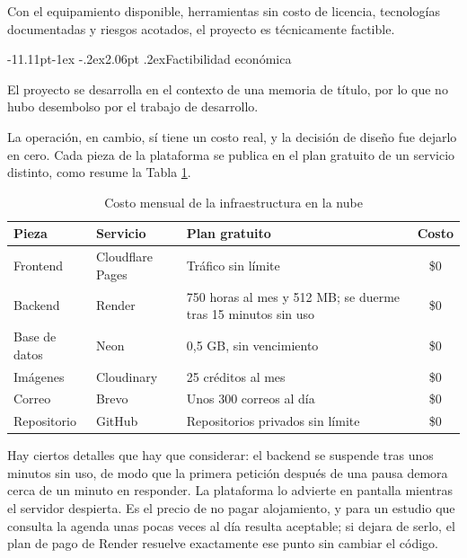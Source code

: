 \documentclass[12pt,letterpaper,oneside]{report}
\makeatletter
\renewcommand\subsection{\@startsection{subsection}{2}{\z@}%
  {-11.11pt\@plus -1ex \@minus -.2ex}{2.06pt \@plus .2ex}{\normalfont\normalsize\bfseries}}
\makeatother
\begin{document}
Con el equipamiento disponible, herramientas sin costo de licencia, tecnologías documentadas y riesgos acotados, el proyecto es técnicamente factible.

\subsection{Factibilidad económica}

El proyecto se desarrolla en el contexto de una memoria de título, por lo que no hubo desembolso por el trabajo de desarrollo.

La operación, en cambio, sí tiene un costo real, y la decisión de diseño fue dejarlo en cero. Cada pieza de la plataforma se publica en el plan gratuito de un servicio distinto, como resume la Tabla \ref{tab:infraestructura}. 

\begin{table}[H]
  \centering
  \caption{Costo mensual de la infraestructura en la nube}
  \label{tab:infraestructura}
  \renewcommand{\arraystretch}{1.2}
  \begin{tabular}{|l|l|p{6.1cm}|c|}
    \hline
    \textbf{Pieza} & \textbf{Servicio} & \textbf{Plan gratuito} & \textbf{Costo} \\
    \hline
    Frontend & Cloudflare Pages & Tráfico sin límite & \$0 \\ \hline
    Backend & Render & 750 horas al mes y 512 MB; se duerme tras 15 minutos sin uso & \$0 \\ \hline
    Base de datos & Neon & 0,5 GB, sin vencimiento & \$0 \\ \hline
    Imágenes & Cloudinary & 25 créditos al mes & \$0 \\ \hline
    Correo & Brevo & Unos 300 correos al día & \$0 \\ \hline
    Repositorio & GitHub & Repositorios privados sin límite & \$0 \\ \hline
  \end{tabular}
\end{table}

Hay ciertos detalles que hay que considerar: el backend se suspende tras unos minutos sin uso, de modo que la primera petición después de una pausa demora cerca de un minuto en responder. La plataforma lo advierte en pantalla mientras el servidor despierta. Es el precio de no pagar alojamiento, y para un estudio que consulta la agenda unas pocas veces al día resulta aceptable; si dejara de serlo, el plan de pago de Render resuelve exactamente ese punto sin cambiar el código.
\end{document}
